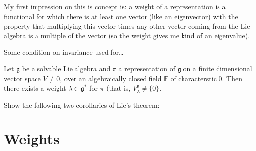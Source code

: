 My first impression on this is concept is: a weight of a representation is a
functional for which there is at least one vector (like an eigenvector) with the
property that 
multiplying this vector times any other vector coming from the Lie algebra 
is a multiple of the vector (so the weight gives me kind of an eigenvalue).
\begin{lemma}
\label{lemma-Lie}
Some condition on invariance used for…
\end{lemma}

\begin{theorem}
\label{theorem-Lie}
Let $\mathfrak{g}$ be a solvable Lie algebra and $\pi$ a representation of
$\mathfrak{g}$ on a finite dimensional vector space $V \neq 0$, over an
algebraically closed field $\mathbb{F}$ of characterstic 0. 
Then there exists a weight $\lambda \in \mathfrak{g}^*$ for $\pi$ 
(that is, $V_\lambda^\mathfrak{g} \neq \{0\}$.
\end{theorem}

\begin{exercise}
\label{exercise-corollaries-of-Lie-theorem}
Show the following two corollaries of Lie's theorem:
\end{exercise}


\section{Weights}
\label{section-weights}









